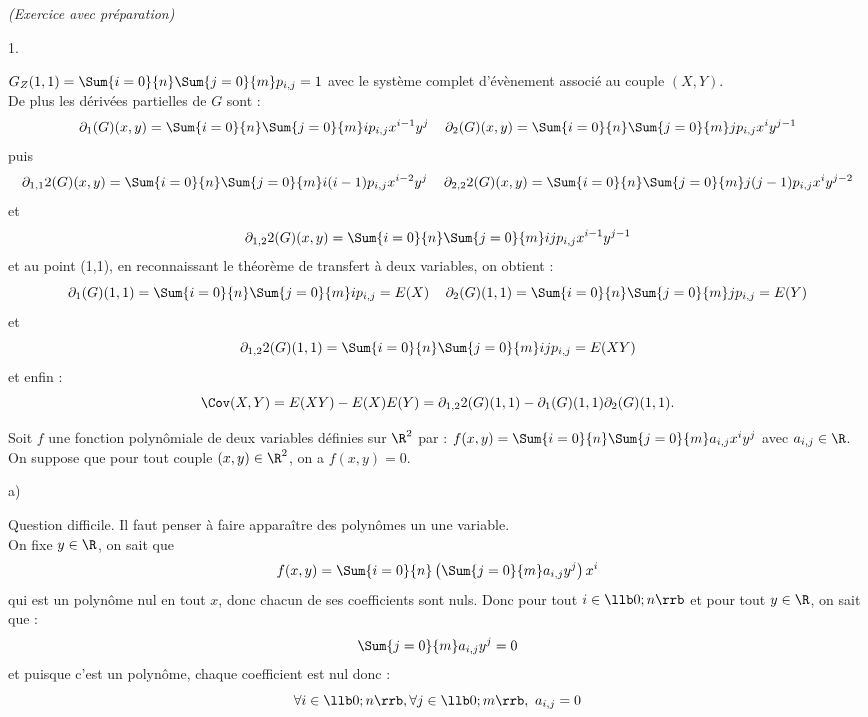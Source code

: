 \documentclass[11pt]{article}%
\begin{document}
\begin{exercice}{\it (Exercice avec préparation)}
\begin{noliste}{1.}
  \item $G_{Z} (1, 1 ) = \Sum{i = 0}{n} \Sum{j = 0}{m} p_{i,j} = 1 $
    avec le système complet d'évènement associé au couple $(X,Y)$.\\
    De plus les dérivées partielles de $G$ sont :    
    \[
    \partial_{1} (G ) (x,y) = \Sum{i = 0}{n} \Sum{j = 0}{m} i p_{i,j}
    x^{i-1} y^{j} \ \, \ \ \partial_{2} (G ) (x,y) = \Sum{i = 0}{n}
    \Sum{j = 0}{m} j p_{i,j} x^{i} y^{j-1}
    \]
    puis    
    \[
    \partial_{1,1}{2} (G ) (x,y) = \Sum{i = 0}{n} \Sum{j = 0}{m} i (i-1)
    p_{i,j} x^{i-2} y^{j} \ \, \ \ \partial_{2,2}{2} (G ) (x,y) = 
    \Sum{i = 0}{n} \Sum{j = 0}{m} j (j-1) p_{i,j} x^{i} y^{j-2}
    \]
    et
    \[
    \partial_{1,2}{2} (G ) (x,y) = \Sum{i = 0}{n} \Sum{j = 0}{m} i j
    p_{i,j} x^{i-1} y^{j-1}
    \]
    et au point (1,1), en reconnaissant le théorème de transfert à
    deux variables, on obtient :    
    \[
    \partial_{1} (G ) (1,1) = \Sum{i = 0}{n} \Sum{j = 0}{m} i p_{i,j}
    = E ( X ) \ \, \ \ \partial_{2} (G ) (1,1) = \Sum{i = 0}{n} \Sum{j
      = 0}{m} j p_{i,j} = E ( Y )
    \]
    et
    \[
    \partial_{1,2}{2} (G ) (1,1) = \Sum{i = 0}{n} \Sum{j = 0}{m} i j
    p_{i,j} = E ( X Y )
    \]
    et enfin :
    \[
    \Cov ( X, Y ) = E ( X Y ) - E ( X ) E ( Y ) = \partial_{1,2}{2} (G )
    (1,1) - \partial_{1} (G ) (1,1) \partial_{2} (G ) (1,1).
    \]
    
  \item Soit $f$ une fonction polynômiale de deux variables définies
    sur $\R^{2}$ par : $f(x,y) = \Sum{i = 0}{n} \Sum{j = 0}{m} a_{i,j}
    x^{i} y^{j}$ avec $a_{i,j} \in \R$. \\
    On suppose que pour tout couple $(x,y) \in \R^{2}$, on a $f(x,y) =
    0$.
    \begin{noliste}{a)}
      \setlength{\itemsep}{2mm}
    \item Question difficile. Il faut penser à faire apparaître des
      polynômes un une variable. \\
      On fixe $y \in \R$, on sait que      
      \[
      f ( x, y) = \Sum{i = 0}{n} \left( \Sum{j = 0}{m} a_{i,j} y^{j}
      \right) x^{i}
      \]
      qui est un polynôme nul en tout $x$, donc chacun de ses
      coefficients sont nuls. Donc pour tout $i \in \llb 0 ; n \rrb $
      et pour tout $y \in \R$, on sait que :
      \[
      \Sum{j = 0}{m} a_{i,j} y^{j} = 0
      \]
      et puisque c'est un polynôme, chaque coefficient est nul donc :      
      \[
      \forall i \in \llb 0 ; n \rrb, \forall j \in \llb 0 ; m \rrb, \
      a_{i,j} = 0
      \]
      

\end{noliste}
\end{noliste}
\end{exercice}
\end{document}
